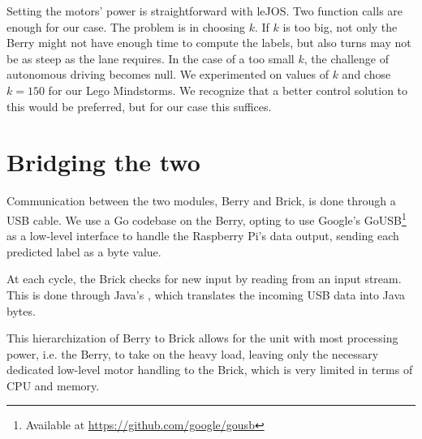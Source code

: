 Setting the motors' power is straightforward with leJOS. Two function calls are enough for our
case. The problem is in choosing $k$. If $k$ is too big, not only the Berry might not have enough
time to compute the labels, but also turns may not be as steep as the lane requires. In the case of
a too small $k$, the challenge of autonomous driving becomes null. We experimented on values of $k$
and chose $k=150$ for our Lego Mindstorms. We recognize that a better control solution to this
would be preferred, but for our case this suffices.

\section{Bridging the two}

Communication between the two modules, Berry and Brick, is done through a USB cable. We use a Go
codebase on the Berry, opting to use Google's GoUSB\footnote{Available at
\url{https://github.com/google/gousb}} as a low-level interface to handle the Raspberry Pi's data
output, sending each predicted label as a byte value.

At each cycle, the Brick checks for new input by reading from an input stream. This is done through
Java's , which translates the incoming USB data into Java bytes.

This hierarchization of Berry to Brick allows for the unit with most processing power, i.e.  the
Berry, to take on the heavy load, leaving only the necessary dedicated low-level motor handling to
the Brick, which is very limited in terms of CPU and memory.


